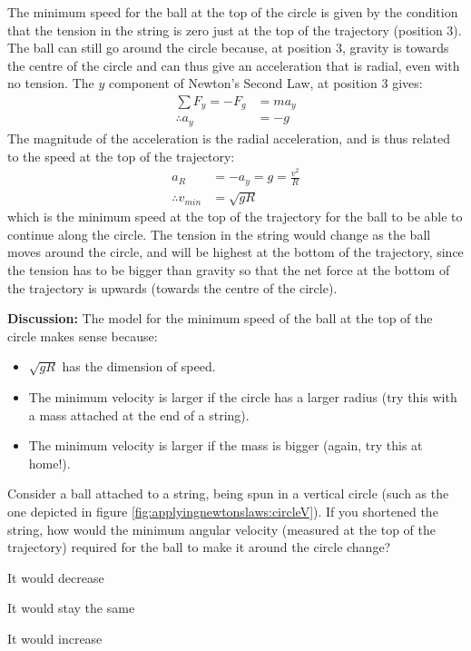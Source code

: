 \begin{example}
The minimum speed for the ball at the top of the circle is given by the condition that the tension in the string is zero just at the top of the trajectory (position 3). The ball can still go around the circle because, at position 3, gravity is towards the centre of the circle and can thus give an acceleration that is radial, even with no tension. The $y$ component of Newton's Second Law, at position 3 gives:
\begin{align*}
\sum F_y = -F_g &= ma_y\\
\therefore a_y &=-g
\end{align*}
The magnitude of the acceleration is the radial acceleration, and is thus related to the speed at the top of the trajectory:
\begin{align*}
a_R&=-a_y=g = \frac{v^2}{R}\\
\therefore v_{min}&=\sqrt{gR}
\end{align*}
which is the minimum speed at the top of the trajectory for the ball to be able to continue along the circle. The tension in the string would change as the ball moves around the circle, and will be highest at the bottom of the trajectory, since the tension has to be bigger than gravity so that the net force at the bottom of the trajectory is upwards (towards the centre of the circle).

\textbf{Discussion:} The model for the minimum speed of the ball at the top of the circle makes sense because:
\begin{itemize}
\item $\sqrt{gR}$ has the dimension of speed.
\item The minimum velocity is larger if the circle has a larger radius (try this with a mass attached at the end of a string). 
\item The minimum velocity is larger if the mass is bigger (again, try this at home!). 
\end{itemize}
\end{example}

\begin{checkpoint}
\begin{MCquestion}{Consider a ball attached to a string, being spun in a vertical circle (such as the one depicted in figure \ref{fig:applyingnewtonslaws:circleV}). If you shortened the string, how would the minimum angular velocity (measured at the top of the trajectory) required for the ball to make it around the circle change? }
\item It would decrease \correct
\item It would stay the same
\item It would increase
\end{MCquestion}
\end{checkpoint}


